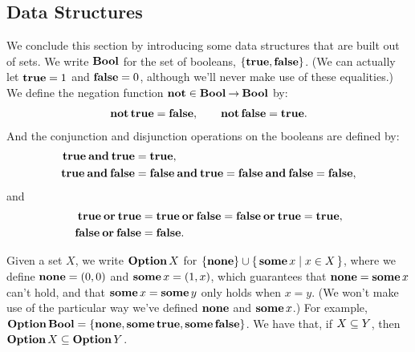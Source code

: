 \subsection{Data Structures}

%
%
We conclude this section by introducing some data structures that
are built out of sets.
We write $\mathbf{Bool}$ for the set of booleans, $\{\mathbf{true},\mathbf{false}\}$.
%
%
%
%
%
%
(We can actually let $\mathbf{true}=1$ and $\mathbf{false}=0$, although we'll
never make use of these equalities.)  We define the negation
function $\mathbf{not}\in\mathbf{Bool}\mathbin{\to}\mathbf{Bool}$ by:
\begin{gather*}
\mathbf{not}\,\mathbf{true} = \mathbf{false} , \qquad
\mathbf{not}\,\mathbf{false} = \mathbf{true} .
\end{gather*}
%
%
%
And the conjunction and disjunction operations on the booleans are
defined by:
\begin{align*}
\mathbf{true}\mathbin{\mathbf{and}}\mathbf{true} &= \mathbf{true} , \\
\mathbf{true}\mathbin{\mathbf{and}}\mathbf{false} &= \mathbf{false}\mathbin{\mathbf{and}}\mathbf{true} = \mathbf{false}\mathbin{\mathbf{and}}\mathbf{false} = \mathbf{false} ,
\end{align*}
%
%
%
and
%
%
%
%
\begin{align*}
\mathbf{true}\mathbin{\mathbf{or}}\mathbf{true} &= \mathbf{true}\mathbin{\mathbf{or}}\mathbf{false} = \mathbf{false}\mathbin{\mathbf{or}}\mathbf{true} = \mathbf{true} , \\
\mathbf{false}\mathbin{\mathbf{or}}\mathbf{false} &= \mathbf{false} .
\end{align*}

Given a set $X$, we write $\mathbf{Option}\,X$ for
%
%
%
%
%
%
%
$\{\mathbf{none}\}\cup\{ \, \mathbf{some}\,x \mid x\in X \, \}$, where we define $\mathbf{none}=(0,0)$
and $\mathbf{some}\,x=(1,x)$, which guarantees that $\mathbf{none}=\mathbf{some}\,x$ can't
hold, and that $\mathbf{some}\,x=\mathbf{some}\,y$ only holds when $x=y$.
(We won't make use of the particular way we've defined $\mathbf{none}$ and
$\mathbf{some}\,x$.)
For example, $\mathbf{Option}\,\mathbf{Bool}=\{\mathbf{none},\mathbf{some}\,\mathbf{true},\mathbf{some}\,\mathbf{false}\}$.
We have that, if $X\subseteq Y$, then $\mathbf{Option}\,X\subseteq\mathbf{Option}\,Y$.

